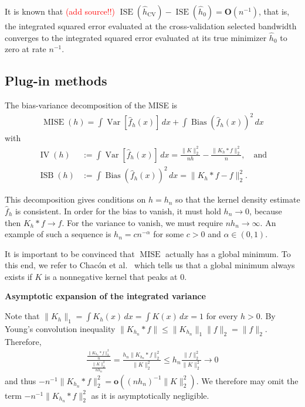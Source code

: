 It is known that \textcolor{red}{(add source!!)} $\operatorname{ISE}(\hat{h}_{\text{CV}})-\operatorname{ISE}(\hat{h}_0)=\mathbf{O}(n^{-1})$, that is, the integrated squared error evaluated at the cross-validation selected bandwidth converges to the integrated squared error evaluated at its true minimizer $\hat{h}_0$ to zero at rate $n^{-1}$.

\subsection*{Plug-in methods}

The bias-variance decomposition of the MISE is
\begin{align*}
    \operatorname{MISE}(h)=\int\operatorname{Var}[\hat{f}_h(x)]\,dx+\int\operatorname{Bias}(\hat{f}_h(x))^2\,dx
\end{align*}
with
\begin{align*}
    \operatorname{IV}(h)&:=\int\operatorname{Var}[\hat{f}_h(x)]\,dx=\frac{\|K\|_2^2}{nh}-\frac{\|K_h\ast f\|_2^2}{n},\quad\text{and}\\
    \operatorname{ISB}(h)&:=\int\operatorname{Bias}(\hat{f}_h(x))^2\,dx=\|K_h\ast f-f\|_2^2.
\end{align*}

This decomposition gives conditions on $h=h_n$ so that the kernel density estimate $\hat{f}_{h}$ is consistent. In order for the bias to vanish, it must hold $h_n\to0$, because then $K_h\ast f\to f$. For the variance to vanish, we must require $nh_n\to\infty$. An example of such a sequence is $h_n=cn^{-\alpha}$ for some $c>0$ and $\alpha\in(0,1)$.

It is important to be convinced that $\operatorname{MISE}$ actually has a global minimum. To this end, we refer to Chacón et al.~\cite[Theorem~1]{chacon_existence_nodate} which tells us that a global minimum always exists if $K$ is a nonnegative kernel that peaks at $0$.

\textbf{Asymptotic expansion of the integrated variance}

Note that $\|K_h\|_1=\int K_h(x)\,dx=\int K(x)\,dx=1$ for every $h>0$. By Young's convolution inequality $\|K_{h_n}\ast f\|\le\|K_{h_n}\|_1\|f\|_2=\|f\|_2$. Therefore,
\begin{align*}
    \frac{\frac{\|K_{h_n}\ast f\|_2^2}{n}}{\frac{\|K\|_2^2}{nh_n}}=\frac{h_n\|K_{h_n}\ast f\|_2^2}{\|K\|_2^2}\le h_n\frac{\|f\|_2^2}{\|K\|_2^2}\to 0
\end{align*}
and thus $-n^{-1}\|K_{h_n}\ast f\|_2^2=\mathbf{o}((nh_n)^{-1}\|K\|_2^2)$. We therefore may omit the term $-n^{-1}\|K_{h_n}\ast f\|_2^2$ as it is asymptotically negligible.

